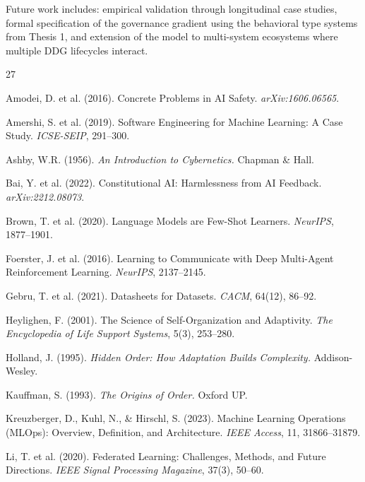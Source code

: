 \documentclass[11pt,a4paper]{article}
\begin{document}
Future work includes: empirical validation through longitudinal case studies, formal specification of the governance gradient using the behavioral type systems from Thesis 1, and extension of the model to multi-system ecosystems where multiple DDG lifecycles interact.

\begin{thebibliography}{27}

Amodei, D. et al. (2016).
\newblock Concrete Problems in AI Safety.
\newblock \emph{arXiv:1606.06565}.

Amershi, S. et al. (2019).
\newblock Software Engineering for Machine Learning: A Case Study.
\newblock \emph{ICSE-SEIP}, 291--300.

Ashby, W.R. (1956).
\newblock \emph{An Introduction to Cybernetics.}
\newblock Chapman \& Hall.

Bai, Y. et al. (2022).
\newblock Constitutional AI: Harmlessness from AI Feedback.
\newblock \emph{arXiv:2212.08073}.

Brown, T. et al. (2020).
\newblock Language Models are Few-Shot Learners.
\newblock \emph{NeurIPS}, 1877--1901.

Foerster, J. et al. (2016).
\newblock Learning to Communicate with Deep Multi-Agent Reinforcement Learning.
\newblock \emph{NeurIPS}, 2137--2145.

Gebru, T. et al. (2021).
\newblock Datasheets for Datasets.
\newblock \emph{CACM}, 64(12), 86--92.

Heylighen, F. (2001).
\newblock The Science of Self-Organization and Adaptivity.
\newblock \emph{The Encyclopedia of Life Support Systems}, 5(3), 253--280.

Holland, J. (1995).
\newblock \emph{Hidden Order: How Adaptation Builds Complexity.}
\newblock Addison-Wesley.

Kauffman, S. (1993).
\newblock \emph{The Origins of Order.}
\newblock Oxford UP.

Kreuzberger, D., Kuhl, N., \& Hirschl, S. (2023).
\newblock Machine Learning Operations (MLOps): Overview, Definition, and Architecture.
\newblock \emph{IEEE Access}, 11, 31866--31879.

Li, T. et al. (2020).
\newblock Federated Learning: Challenges, Methods, and Future Directions.
\newblock \emph{IEEE Signal Processing Magazine}, 37(3), 50--60.


\end{thebibliography}
\end{document}
